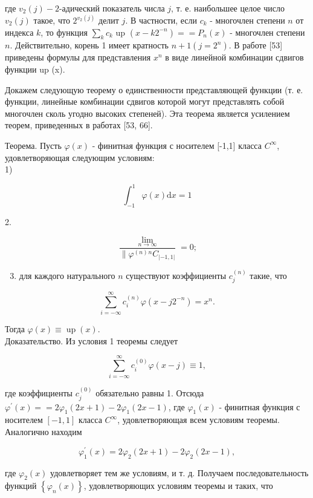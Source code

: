 \documentclass[10pt]{article}
\begin{document}
где $v_{2}(j)-2$-адический показатель числа $j$, т. е. наибольшее целое число $v_{2}(j)$ такое, что $2^{v_{2}(j)}$ делит $j$. В частности, если $c_{k}$ - многочлен степени $n$ от индекса $k$, то функция $\sum_{k} c_{k}$ up $\left(x-k 2^{-n}\right)= =P_{n}(x)$ - многочлен степени $n$. Действительно, корень 1 имеет кратность $n+1\left(j=2^{n}\right)$. В работе [53] приведены формулы для представления $x^{n}$ в виде линейной комбинации сдвигов функции up (x).

Докажем следующую теорему о единственности представляющей функции (т. е. функции, линейные комбинации сдвигов которой могут представлять собой многочлен сколь угодно высоких степеней). Эта теорема является усилением теорем, приведенных в работах [53, 66].

Теорема. Пусть $\varphi(x)$ - финитная функция с носителем [-1,1] класса $C^{\infty}$, удовлетворяющая следующим условиям:\\
1)

$$
\int_{-1}^{1} \varphi(x) \mathrm{d} x=1
$$

2.

$$
\frac{\lim _{n \rightarrow \infty}}{\| \varphi^{(n)}{ }^{n} C_{|-1,1|}}=0 ;
$$

\begin{enumerate}
  \setcounter{enumi}{2}
  \item для каждого натурального $n$ существуют коэффициенты $c_{j}^{(n)}$ такие, что
\end{enumerate}

$$
\sum_{i=-\infty}^{\infty} c_{i}^{(n)} \varphi\left(x-j 2^{-n}\right)=x^{n} .
$$

Тогда $\varphi(x) \equiv \operatorname{up}(x)$.\\
Доказательство. Из условия 1 теоремы следует

$$
\sum_{i=-\infty}^{\infty} c_{i}^{(0)} \varphi(x-j) \equiv 1,
$$

где коэффициенты $c_{j}^{(0)}$ обязательно равны 1. Отсюда $\varphi^{\prime}(x)= =2 \varphi_{1}(2 x+1)-2 \varphi_{1}(2 x-1)$, где $\varphi_{1}(x)$ - финитная функция с носителем $[-1,1]$ класса $C^{\infty}$, удовлетворяющая всем условиям теоремы. Аналогично находим

$$
\varphi_{1}^{\prime}(x)=2 \varphi_{2}(2 x+1)-2 \varphi_{2}(2 x-1),
$$

где $\varphi_{2}(x)$ удовлетворяет тем же условиям, и т. д. Получаем последовательность функций $\left\{\varphi_{n}(x)\right\}$, удовлетворяющих условиям теоремы и таких, что
\end{document}
